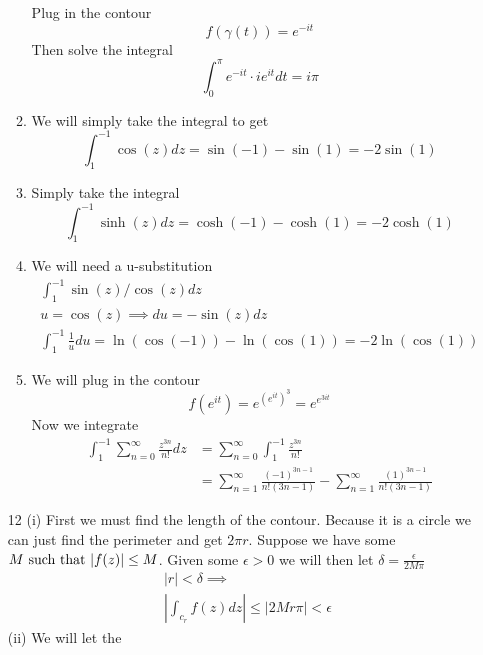 \documentclass{article}
\begin{document}
\begin{enumerate}
\begin{enumerate}[label=(\roman*)]
          Plug in the contour
          \[f(\gamma(t))=e^{-it}\]
          Then solve the integral
          \[\int_{0}^{\pi}e^{-it}\cdot ie^{it}dt=i\pi\]
        \item
          We will simply take the integral to get
          \[\int_1^{-1}\cos(z)dz=\sin(-1)-\sin(1)=-2\sin(1)\]
        \item
          Simply take the integral
          \[\int_1^{-1}\sinh(z)dz=\cosh(-1)-\cosh(1)=-2\cosh(1)\]
        \item
          We will need a u-substitution
          \begin{align*}
            \int_1^{-1}\sin(z)/\cos(z)dz\\
            u=\cos(z)\implies du=-\sin(z)dz\\
            \int_1^{-1}\frac{1}{u}du=\ln(\cos(-1))-\ln(\cos(1))=-2\ln(\cos(1))
          \end{align*}
        \item
          We will plug in the contour
          \[f(e^{it})=e^{(e^{it})^3}=e^{e^{3it}}\]
          Now we integrate
          \begin{align*}
            \int_1^{-1}\sum_{n=0}^\infty \frac{z^{3n}}{n!}dz&=\sum_{n=0}^\infty\int_1^{-1} \frac{z^{3n}}{n!}\\
            &=\sum_{n=1}^\infty \frac{(-1)^{3n-1}}{n!(3n-1)}-\sum_{n=1}^\infty \frac{(1)^{3n-1}}{n!(3n-1)}
          \end{align*}
      \end{enumerate}
    \item[12]
      (i) First we must find the length of the contour. Because it is a circle we can just find the perimeter and get $2\pi r$. Suppose we have some $M\text{ such that }|f(z)|\leq M$. Given some $\epsilon>0$ we will then let $\delta=\frac{\epsilon}{2M\pi}$
      \begin{align*}
        |r|<\delta\implies\\
        \left|\int_{c_r}f(z)dz\right|\leq|2Mr\pi|<\epsilon
      \end{align*}
      (ii) We will let the
  \end{enumerate}
\end{document}
